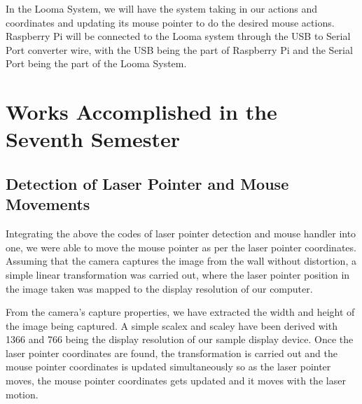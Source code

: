 \documentclass[12pt, a4paper]{article}
\begin{document}
In the Looma System, we will have the system taking in our actions and coordinates and updating its mouse pointer to do the desired mouse actions. Raspberry Pi will be connected to the Looma system through the USB to Serial Port converter wire, with the USB being the part of Raspberry Pi and the Serial Port being the part of the Looma System.

\newpage
\section{Works Accomplished in the Seventh Semester}
\subsection{Detection of Laser Pointer and Mouse Movements}
	Integrating the above the codes of laser pointer detection and mouse handler into one, we were able to move the mouse pointer as per the laser pointer coordinates. Assuming that the camera captures the image from the wall without distortion, a simple linear transformation was carried out, where the laser pointer position in the image taken was mapped to the display resolution of our computer. 

	From the camera's capture properties, we have extracted the width and height of the image being captured. A simple scalex and scaley have been derived with 1366 and 766 being the display resolution of our sample display device. Once the laser pointer coordinates are found, the transformation is carried out and the mouse pointer coordinates is updated simultaneously so as the laser pointer moves, the mouse pointer coordinates gets updated and it moves with the laser motion. 
	
\end{document}
